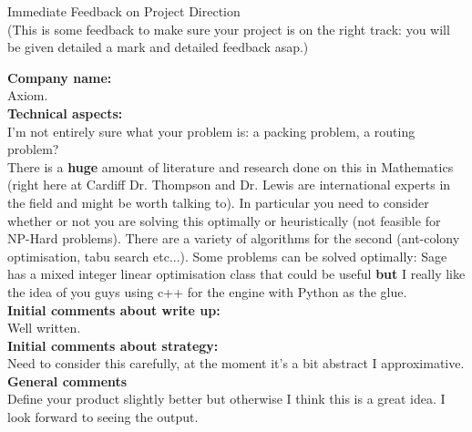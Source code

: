 \documentclass{article}
\begin{document}
\begin{center}
\Huge{Immediate Feedback on Project Direction}\\
\tiny{(This is some feedback to make sure your project is on the right track: you will be given detailed a mark and detailed feedback asap.)}
\end{center}


\normalsize
\textbf{Company name:}\\

Axiom. \\

\textbf{Technical aspects:}\\

I'm not entirely sure what your problem is: a packing problem, a routing problem?\\
There is a \textbf{huge} amount of literature and research done on this in Mathematics (right here at Cardiff Dr. Thompson and Dr. Lewis are international experts in the field and might be worth talking to).
In particular you need to consider whether or not you are solving this optimally or heuristically (not feasible for NP-Hard problems).
There are a variety of algorithms for the second (ant-colony optimisation, tabu search etc...).
Some problems can be solved optimally: Sage has a mixed integer linear optimisation class that could be useful \textbf{but} I really like the idea of you guys using c++ for the engine with Python as the glue.\\

\textbf{Initial comments about write up:}\\

Well written.\\

\textbf{Initial comments about strategy:}\\

Need to consider this carefully, at the moment it's a bit abstract I approximative.\\

\textbf{General comments}\\

Define your product slightly better but otherwise I think this is a great idea.
I look forward to seeing the output.
\end{document}
